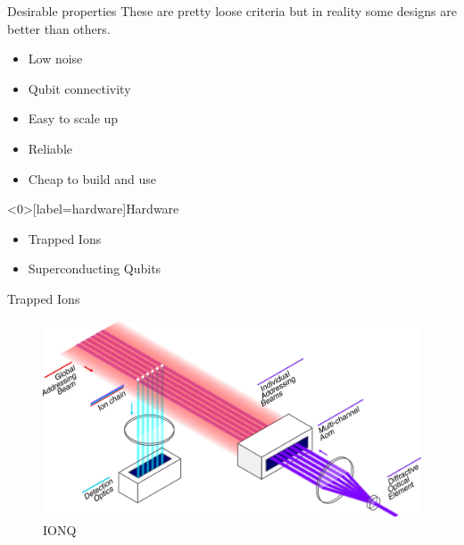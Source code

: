 \documentclass{beamer}
\begin{document}
\begin{frame}{Desirable properties}
    These are pretty loose criteria but in reality some designs are better than others.
    \begin{itemize}
        \item Low noise
        \item Qubit connectivity
        \item Easy to scale up
        \item Reliable 
        \item Cheap to build and use
    \end{itemize}
\end{frame}

\begin{frame}<0>[label=hardware]{Hardware}

    \begin{itemize}
        \item<alert@1> Trapped Ions
        \item<alert@2> Superconducting Qubits
    \end{itemize}
    
\end{frame}


\begin{frame}{Trapped Ions}
    \begin{figure}
        \centering
        \includegraphics[width=\textwidth]{images/ionq_schematic.png}
        \caption{IONQ}
    \end{figure}
\end{frame}
\end{document}
